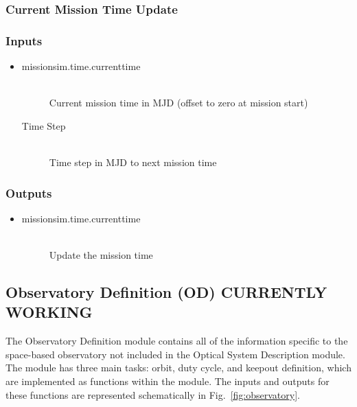 \documentclass[]{asme2ej}
\newcommand{\reffig}[1]{Fig.~\ref{#1}}
\begin{document}
\subsubsection{Current Mission Time Update}

\subsubsection*{Inputs}
\begin{itemize}
    \item 
    \begin{description}
        \item[missionsim.time.currenttime] \hfill \\
        Current mission time in MJD (offset to zero at mission start)
        \item[Time Step] \hfill \\
        Time step in MJD to next mission time
    \end{description}
\end{itemize}

\subsubsection*{Outputs}
\begin{itemize}
    \item
    \begin{description}
        \item[missionsim.time.currenttime] \hfill \\
        Update the mission time
    \end{description}
\end{itemize}


\subsection{Observatory Definition (OD) CURRENTLY WORKING}
The Observatory Definition module contains all of the information specific to the space-based observatory not included in the Optical System Description module. The module has three main tasks: orbit, duty cycle, and keepout definition, which are implemented as functions within the module. The inputs and outputs for these functions are represented schematically in \reffig{fig:observatory}.
\end{document}
